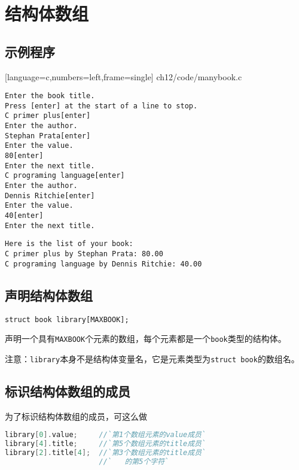 \section{结构体数组}

\subsection{示例程序}

\begin{frame}\ft{\subsecname}

[language=c,numbers=left,frame=single]
{ch12/code/manybook.c}
\end{frame}

\begin{frame}[fragile]\ft{\subsecname}
  \begin{lstlisting}[backgroundcolor=\color{blue!20}]
Enter the book title.
Press [enter] at the start of a line to stop.
C primer plus[enter]
Enter the author.
Stephan Prata[enter]
Enter the value.
80[enter]
Enter the next title.
C programing language[enter]
Enter the author.
Dennis Ritchie[enter]
Enter the value.
40[enter]
Enter the next title.

  \end{lstlisting}
\end{frame}

\begin{frame}[fragile]\ft{\subsecname}
  \begin{lstlisting}[backgroundcolor=\color{blue!20}]
Here is the list of your book:
C primer plus by Stephan Prata: 80.00
C programing language by Dennis Ritchie: 40.00    
  \end{lstlisting}
\end{frame}

\subsection{声明结构体数组}
\begin{frame}[fragile]\ft{\subsecname}
  \begin{lstlisting}
struct book library[MAXBOOK];
  \end{lstlisting}
声明一个具有\verb|MAXBOOK|个元素的数组，每个元素都是一个\verb|book|类型的结构体。\vspace{0.1in}

注意：\verb|library|本身不是结构体变量名，它是元素类型为\verb|struct book|的数组名。
\end{frame}

\subsection{标识结构体数组的成员}
\begin{frame}[fragile]\ft{\subsecname}
  为了标识结构体数组的成员，可这么做
  \begin{lstlisting}[language=c,backgroundcolor=\color{red!20}]
library[0].value;     //`第1个数组元素的value成员`
library[4].title;     //`第5个数组元素的title成员`
library[2].title[4];  //`第3个数组元素的title成员`
                      //`   的第5个字符`
  \end{lstlisting}
\end{frame}

